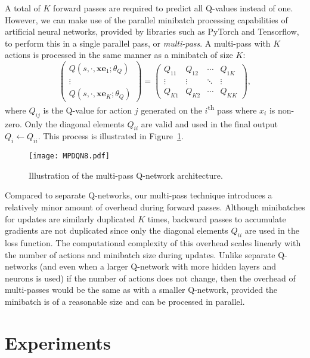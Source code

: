 \documentclass{article}
\begin{document}
A total of $K$ forward passes are required to predict all Q-values instead of one. However, we can make use of the parallel minibatch processing capabilities of artificial neural networks, provided by libraries such as PyTorch and Tensorflow, to perform this in a single parallel pass, or \emph{multi-pass}. A multi-pass with $K$ actions is processed in the same manner as a minibatch of size $K$:
\begin{equation}
\begin{pmatrix}
Q\left( s,\cdotp,\mathbf{xe}_1; \theta_Q \right)\\
\vdots \\
Q\left( s,\cdotp,\mathbf{xe}_K; \theta_Q \right)
\end{pmatrix}=
\begin{pmatrix}
Q_{11} & Q_{12}  & \cdots & Q_{1K}\\
\vdots & \vdots  &\ddots  & \vdots \\
Q_{K1} & Q_{K2}  & \cdots & Q_{KK}
\end{pmatrix},
\end{equation}
where $Q_{ij}$ is the Q-value for action $j$ generated on the $i$\textsuperscript{th} pass where $x_i$ is non-zero. Only the diagonal elements $Q_{ii}$ are valid and used in the final output $Q_i \gets Q_{ii}$. This process is illustrated in Figure~\ref{fig:mpdqn}.
\begin{figure}[ht]
	\centering
\texttt{[image: MPDQN8.pdf]}
	\caption{Illustration of the multi-pass Q-network architecture.}
	\label{fig:mpdqn}
\end{figure}

Compared to separate Q-networks, our multi-pass technique introduces a relatively minor amount of overhead during forward passes. Although minibatches for updates are similarly duplicated $K$ times, backward passes to accumulate gradients are not duplicated since only the diagonal elements $Q_{ii}$ are used in the loss function. The computational complexity of this overhead scales linearly with the number of actions and minibatch size during updates. Unlike separate Q-networks (and even when a larger Q-network with more hidden layers and neurons is used) if the number of actions does not change, then the overhead of multi-passes would be the same as with a smaller Q-network, provided the minibatch is of a reasonable size and can be processed in parallel.

\section{Experiments}
\end{document}
